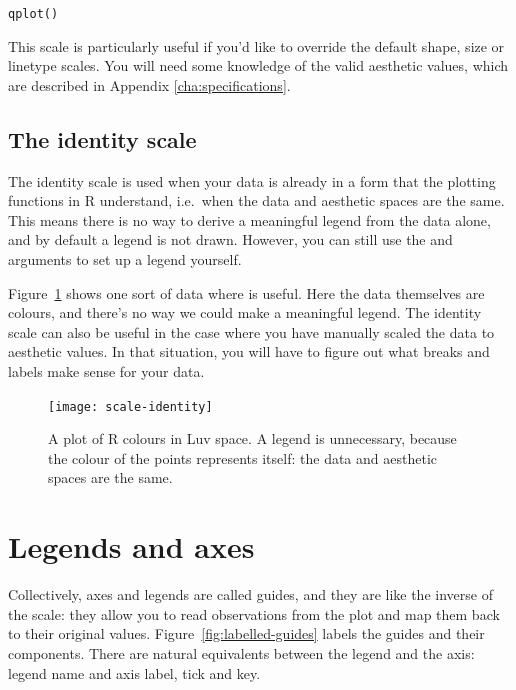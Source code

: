 \begin{alltt}
qplot()
\end{alltt}

This scale is particularly useful if you'd like to override the default shape, size or linetype scales.  You will need some knowledge of the valid aesthetic values, which are described in Appendix \ref{cha:specifications}.

\subsection{The identity scale}
\label{sub:scale-identity}

The identity scale is used when your data is already in a form that the plotting functions in R understand, i.e.\ when the data and aesthetic spaces are the same.  This means there is no way to derive a meaningful legend from the data alone, and by default a legend is not drawn.  However, you can still use the  and  arguments to set up a legend yourself.

Figure~\ref{fig:scale-identity} shows one sort of data where  is useful.  Here the data themselves are colours, and there's no way we could make a meaningful legend.  The identity scale can also be useful in the case where you have manually scaled the data to aesthetic values.  In that situation, you will have to figure out what breaks and labels make sense for your data.

\begin{figure}[htbp]
  \centering
    \texttt{[image: scale-identity]}
  \caption{A plot of R colours in Luv space.  A legend is unnecessary, because the colour of the points represents itself: the data and aesthetic spaces are the same.}
  \label{fig:scale-identity}
\end{figure}

\section{Legends and axes}
\label{sec:guides}

Collectively, axes and legends are called guides, and they are like the inverse of the scale: they allow you to read observations from the plot and map them back to their original values.  Figure~\ref{fig:labelled-guides} labels the guides and their components.  There are natural equivalents between the legend and the axis: legend name and axis label, tick and key.

